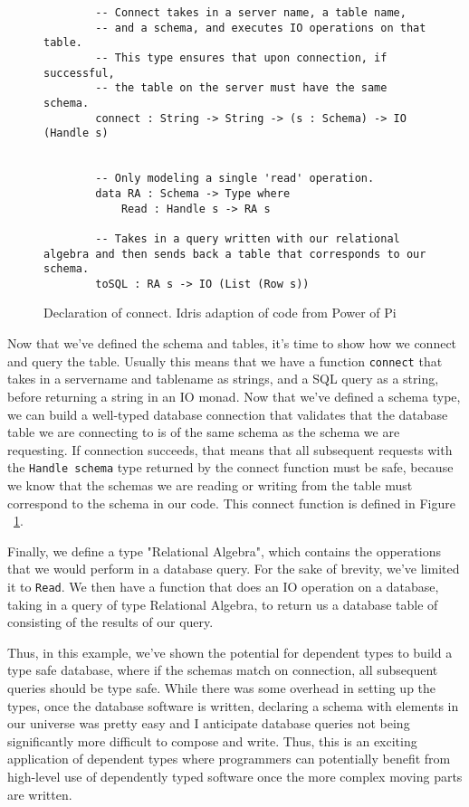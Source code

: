 \begin{figure}[ht!]
    \caption{Declaration of connect. Idris adaption of code from Power of Pi
    \cite{power_of_pi}}
    \label{connect}
    \begin{lstlisting}
        -- Connect takes in a server name, a table name, 
        -- and a schema, and executes IO operations on that table. 
        -- This type ensures that upon connection, if successful, 
        -- the table on the server must have the same schema. 
        connect : String -> String -> (s : Schema) -> IO (Handle s)

        
        -- Only modeling a single 'read' operation. 
        data RA : Schema -> Type where
            Read : Handle s -> RA s
        
        -- Takes in a query written with our relational algebra and then sends back a table that corresponds to our schema. 
        toSQL : RA s -> IO (List (Row s))
    \end{lstlisting}
\end{figure}

Now that we've defined the schema and tables, it's time to show how we connect
and query the table. Usually this means that we have a function \texttt{connect}
that takes in a servername and tablename as strings, and a SQL query as a
string, before returning a string in an IO monad. Now that we've defined a
schema type, we can build a well-typed database connection that validates that
the database table we are connecting to is of the same schema as the schema we
are requesting. If connection succeeds, that means that all subsequent requests
with the \texttt{Handle schema} type returned by the connect function must be
safe, because we know that the schemas we are reading or writing from the table
must correspond to the schema in our code. This connect function is defined in
Figure ~\ref{connect}. 

Finally, we define a type "Relational Algebra", which contains the opperations
that we would perform in a database query. For the sake of brevity, we've 
limited it to \texttt{Read}. We then have a function that does an IO operation
on a database, taking in a query of type Relational Algebra, to return us
a database table of consisting of the results of our query. 

Thus, in this example, we've shown the potential for dependent types to build a
type safe database, where if the schemas match on connection, all subsequent
queries should be type safe. While there was some overhead in setting up the
types, once the database software is written, declaring a schema with elements
in our universe was pretty easy and I anticipate database queries not being
significantly more difficult to compose and write. Thus, this is an exciting
application of dependent types where programmers can potentially benefit from
high-level use of dependently typed software once the more complex moving parts
are written. 


